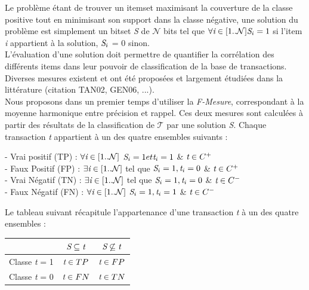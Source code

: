 \documentclass[a4paper,10pt]{report}
\begin{document}
	Le problème étant de trouver un itemset maximisant la couverture de la classe positive tout en minimisant son support dans la classe négative, une solution du problème est simplement un bitset \emph{S} de $\mathcal{N}$ bits tel que $\forall \emph{i} \in [1..\mathcal{N}] \emph{S}_{i} = 1$ si l'item \emph{i} appartient à la solution, $\emph{S}_{i}$ = 0 sinon. \\
	L'évaluation d'une solution doit permettre de quantifier la corrélation des différents items dans leur pouvoir de classification de la base de transactions. Diverses mesures existent et ont été proposées et largement étudiées dans la littérature (citation TAN02, GEN06, ...).\\
	Nous proposons dans un premier temps d'utiliser la \emph{F-Mesure}, correspondant à la moyenne harmonique entre précision et rappel. Ces deux mesures sont calculées à partir des résultats de la classification de $\mathcal{T}$ par une solution \emph{S}. Chaque transaction \emph{t} appartient à un des quatre ensembles suivants : 
\begin{center}
	- Vrai positif (TP) : $\forall \emph{i} \in [1..\mathcal{N}]$  $\emph{S}_{i} = 1 et \emph{t}_{i} = 1$ \&  $\emph{t} \in C^{+}$ \\
	- Faux Positif (FP) : $\exists \emph{i} \in [1..\mathcal{N}]$ tel que $\emph{S}_{i} = 1, \emph{t}_{i} = 0$ \&  $\emph{t} \in C^{+}$\\
	- Vrai Négatif (TN) : $\exists \emph{i} \in [1..\mathcal{N}]$ tel que $\emph{S}_{i} = 1, \emph{t}_{i} = 0$ \&  $\emph{t} \in C^{-}$\\
	- Faux Négatif (FN) : $\forall \emph{i} \in [1..\mathcal{N}]$ $\emph{S}_{i} = 1, \emph{t}_{i} = 1$ \&  $\emph{t} \in C^{-}$\\
\end{center}

 Le tableau suivant récapitule l'appartenance d'une transaction \emph{t} à un des quatre ensembles : 
	 
\begin{center}
	\begin{tabular}{|c|c|c|}
		\hline
		& $\emph{S} \subseteq \emph{t}$ & $\emph{S} \not\subseteq \emph{t}$ \\
		\hline
		Classe \emph{t} = 1 & $\emph{t} \in TP$ & $\emph{t} \in FP$ \\
		\hline
		Classe \emph{t} = 0 & $\emph{t} \in FN$ & $\emph{t} \in TN$ \\
		\hline
\end{tabular}
\end{center}
\end{document}
